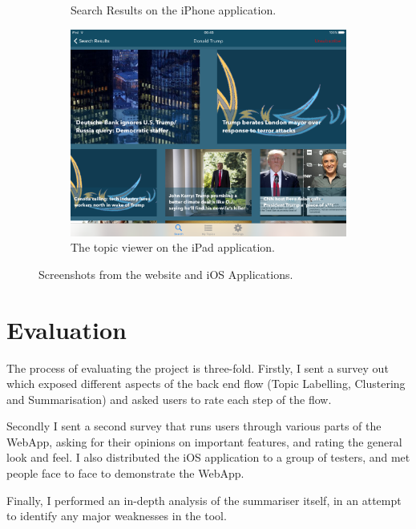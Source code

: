 \documentclass[12pt]{article}
\begin{document}
\begin{figure}[ht!]
\begin{subfigure}[t]{0.3\textwidth}
   \caption{Search Results on the iPhone application.}
   \end{subfigure}
   \qquad
    \begin{subfigure}[t]{0.6\textwidth}
    \includegraphics[width=\textwidth]{iPadScreenshot.PNG}
   \caption{The topic viewer on the iPad application.}
   \end{subfigure}
   \caption[Screenshots from the website and iOS Applications]{Screenshots from the website and iOS Applications.}
   \label{appscreenshots}
\end{figure}


\clearpage

\section{Evaluation}

The process of evaluating the project is three-fold. Firstly, I sent a survey out which exposed different aspects of the back end flow (Topic Labelling, Clustering and Summarisation) and asked users to rate each step of the flow.

Secondly I sent a second survey that runs users through various parts of the WebApp, asking for their opinions on important features, and rating the general look and feel. I also distributed the iOS application to a group of testers, and met people face to face to demonstrate the WebApp.

Finally, I performed an in-depth analysis of the summariser itself, in an attempt to identify any major weaknesses in the tool. 
\end{document}
